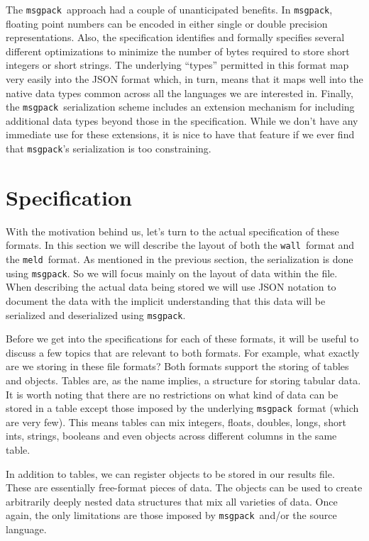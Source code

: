 \documentclass[11pt,a4paper,twocolumn]{article}
\newcommand{\wall}{\texttt{wall}}
\newcommand{\meld}{\texttt{meld}}
\newcommand{\msgpack}{\texttt{msgpack}}
\begin{document}
The \msgpack\ approach had a couple of unanticipated benefits.  In
\msgpack, floating point numbers can be encoded in either single or
double precision representations.  Also, the specification identifies
and formally specifies several different optimizations to minimize the
number of bytes required to store short integers or short strings.
The underlying ``types'' permitted in this format map very easily into
the JSON format which, in turn, means that it maps well into the
native data types common across all the languages we are interested
in.  Finally, the \msgpack\ serialization scheme includes an extension
mechanism for including additional data types beyond those in the
specification.  While we don't have any immediate use for these
extensions, it is nice to have that feature if we ever find that
\msgpack's serialization is too constraining.

\section{Specification}
\label{sec:spec}

With the motivation behind us, let's turn to the actual specification
of these formats.  In this section we will describe the layout of both
the \wall\ format and the \meld\ format.  As mentioned in the previous
section, the serialization is done using \msgpack.  So we will focus
mainly on the layout of data within the file.  When describing the
actual data being stored we will use JSON notation to document the
data with the implicit understanding that this data will be serialized
and deserialized using \msgpack.


Before we get into the specifications for each of these formats, it
will be useful to discuss a few topics that are relevant to both
formats.  For example, what exactly are we storing in these file
formats?  Both formats support the storing of tables and objects.
Tables are, as the name implies, a structure for storing tabular data.
It is worth noting that there are no restrictions on what kind of data
can be stored in a table except those imposed by the underlying
\msgpack\ format (which are very few).  This means tables can mix
integers, floats, doubles, longs, short ints, strings, booleans and
even objects across different columns in the same table.

In addition to tables, we can register objects to be stored in our
results file.  These are essentially free-format pieces of data.  The
objects can be used to create arbitrarily deeply nested data
structures that mix all varieties of data.  Once again, the only
limitations are those imposed by \msgpack\ and/or the source language.
\end{document}
